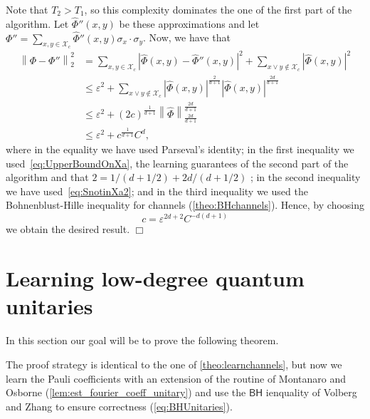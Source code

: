 \documentclass[11pt]{article}
\newcommand{\norm}[1]{\left\|{#1}\right\|}
\newcommand{\eps}{\varepsilon}
\newcommand{\BH}{\textsf{BH}}
\theoremstyle{plain}
\theoremstyle{plain}
\theoremstyle{definition}
\theoremstyle{remark}
\renewenvironment{proof}[1][]{
    \begin{trivlist}
    \item[\hspace{\labelsep}{\em\noindent Proof#1:\/}]}
    {{\hfill$\Box$}
    \end{trivlist}
}
\theoremstyle{named}
\begin{document}
\begin{proof}
Note that $T_2>T_1$, so this complexity dominates the one of the first part of the algorithm. Let $\widehat\Phi''(x,y)$ be these approximations and let $\Phi''=\sum_{x,y\in \mathcal{X}_c}\widehat\Phi''(x,y)\sigma_x\cdot\sigma_y$. Now, we have that 
\begin{align*}
    \norm{\Phi-\Phi''}_2^2&=\sum_{x,y\in\mathcal{X}_c}|\widehat \Phi(x,y)-\widehat\Phi''(x,y)|^2+\sum_{x\lor y\notin\mathcal{X}_c}|\widehat \Phi(x,y)|^2 \\
    &\leq\eps^2+\sum_{x\lor y\notin\mathcal{X}_c} |\widehat\Phi(x,y)|^{\frac{2}{d+1}}|\widehat \Phi(x,y)|^{\frac{2d}{d+1}}
    \\
    &\leq \eps^2+(2c)^{\frac{1}{d+1}}\norm{\widehat \Phi}_{\frac{2d}{d+1}}^{\frac{2d}{d+1}}\\
    &\leq \eps^2+c^{\frac{1}{d+1}} C^{d},
\end{align*}
where in the equality we have used Parseval's identity; in the first inequality we used~\cref{eq:UpperBoundOnXa}, the learning guarantees of the second part of the algorithm and that $2=1/(d+1/2)+2d/(d+1/2)$
; in the second inequality we have used~\cref{eq:SnotinXa2}; and in the third inequality we used the Bohnenblust-Hille inequality for channels (\cref{theo:BHchannels}). Hence, by choosing $$c=\eps^{2d+2}C^{-d(d+1)}$$ we obtain the desired result.
\end{proof}









\section{Learning low-degree quantum unitaries}
In this section our goal will be to prove the following theorem.

\learnunitaries*

The proof strategy is identical to the one of \cref{theo:learnchannels}, but now we learn the Pauli coefficients with an extension of the routine of Montanaro and Osborne (\cref{lem:est_fourier_coeff_unitary}) and use the $\BH$ ienquality of Volberg and Zhang to ensure correctness (\cref{eq:BHUnitaries}). 
\end{document}
